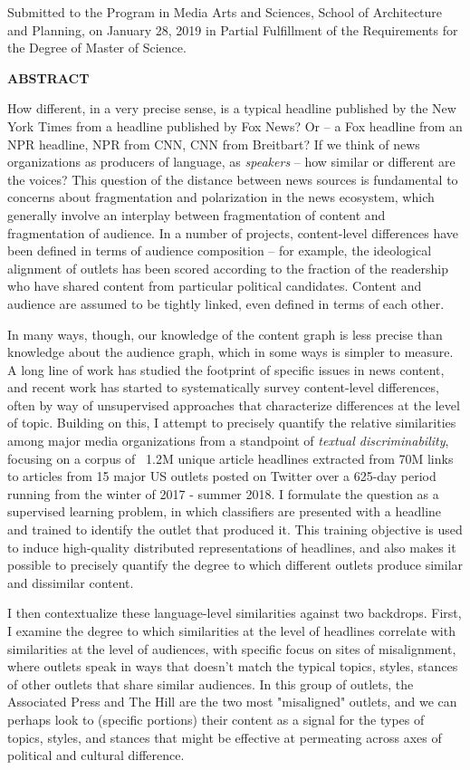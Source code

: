 \documentclass{scrartcl}
\begin{document}
\begin{center}
Submitted to the Program in Media Arts and Sciences, School of Architecture and Planning, on January 28, 2019 in Partial Fulfillment of the Requirements for the Degree of Master of Science.
\end{center}

\textbf{ABSTRACT}

How different, in a very precise sense, is a typical headline published by the New York Times from a headline published by Fox News? Or -- a Fox headline from an NPR headline, NPR from CNN, CNN from Breitbart? If we think of news organizations as producers of language, as \textit{speakers} -- how similar or different are the voices? This question of the distance between news sources is fundamental to concerns about fragmentation and polarization in the news ecosystem, which generally involve an interplay between fragmentation of content and fragmentation of audience. In a number of projects, content-level differences have been defined in terms of audience composition -- for example, the ideological alignment of outlets has been scored according to the fraction of the readership who have shared content from particular political candidates. Content and audience are assumed to be tightly linked, even defined in terms of each other.

In many ways, though, our knowledge of the content graph is less precise than knowledge about the audience graph, which in some ways is simpler to measure. A long line of work has studied the footprint of specific issues in news content, and recent work has started to systematically survey content-level differences, often by way of unsupervised approaches that characterize differences at the level of topic. Building on this, I attempt to precisely quantify the relative similarities among major media organizations from a standpoint of \textit{textual discriminability}, focusing on a corpus of ~1.2M unique article headlines extracted from 70M links to articles from 15 major US outlets posted on Twitter over a 625-day period running from the winter of 2017 - summer 2018. I formulate the question as a supervised learning problem, in which classifiers are presented with a headline and trained to identify the outlet that produced it. This training objective is used to induce high-quality distributed representations of headlines, and also makes it possible to precisely quantify the degree to which different outlets produce similar and dissimilar content.

I then contextualize these language-level similarities against two backdrops. First, I examine the degree to which similarities at the level of headlines correlate with similarities at the level of audiences, with specific focus on sites of misalignment, where outlets speak in ways that doesn't match the typical topics, styles, stances of other outlets that share similar audiences. In this group of outlets, the Associated Press and The Hill are the two most "misaligned" outlets, and we can perhaps look to (specific portions) their content as a signal for the types of topics, styles, and stances that might be effective at permeating across axes of political and cultural difference.
\end{document}
